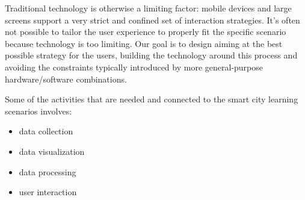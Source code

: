 Traditional technology is otherwise a limiting factor: mobile devices and large screens support a very strict and confined set of interaction strategies. It's often not possible to tailor the user experience to properly fit the specific scenario because technology is too limiting.
Our goal is to design aiming at the best possible strategy for the users, building the technology around this process and avoiding the constraints typically introduced by more general-purpose hardware/software combinations.

Some of the activities that are needed and connected to the smart city learning scenarios involves:

\begin{itemize}
\item data collection
\item data visualization
\item data processing
\item user interaction
\end{itemize}
